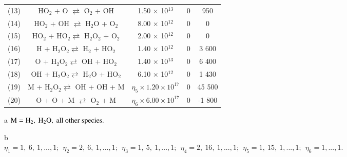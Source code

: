 \documentclass{warpdoc}
\begin{document}
\begin{table}[t]
\begin{center}
\begin{threeparttable}
\begin{tabular}{ccccc}
(13) & HO$_{2}$ + O $\rightleftarrows$ O$_{2}$ + OH & 1.50 $\times$ 10$^{13}$ & 0 &  950 \\
(14) & HO$_{2}$ + OH $\rightleftarrows$ H$_{2}$O + O$_{2}$ & 8.00 $\times$ 10$^{12}$ & 0 & 0 \\
(15) & HO$_{2}$ + HO$_{2} \rightleftarrows$ H$_{2}$O$_{2}$ + O$_{2}$ & 2.00 $\times$ 10$^{12}$ & 0 & 0 \\
(16) & H + H$_{2}$O$_{2} \rightleftarrows$ H$_{2}$ + HO$_{2}$ & 1.40 $\times$ 10$^{12}$ & 0 & 3 600 \\
(17) & O + H$_{2}$O$_{2} \rightleftarrows$ OH + HO$_{2}$ & 1.40 $\times$ 10$^{13}$ & 0 & 6 400 \\
(18) & OH + H$_{2}$O$_{2} \rightleftarrows$ H$_{2}$O + HO$_{2}$ & 6.10 $\times$ 10$^{12}$ & 0 & 1 430 \\
(19) & M + H$_{2}$O$_{2} \rightleftarrows$ OH + OH + M & $\eta_5 \times 1.20 \times 10^{17}$ & 0 & 45 500 \\
(20) & O + O + M $\rightleftarrows$ O$_{2}$ + M & $\eta_6 \times 6.00 \times 10^{17}$ & 0 & -1 800 \\
\bottomrule
\end{tabular}
\begin{tablenotes}
\item[{a}] $\rm M=H_2,~H_2 O,~all~other~species.$
\item[{b}] $\eta_1=1,~6,~1,...,1;~~\eta_2=2,~6,~1,...,1;~~\eta_3=1,~5,~1,...,1;~~\eta_4=2,~16,~1,...,1;~~\eta_5=1,~15,~1,...,1;~~\eta_6=1,...,1.$
\end{tablenotes}
\label{tab:jachimowski}
\end{threeparttable}
\end{center}
\end{table}
%
\end{document}
